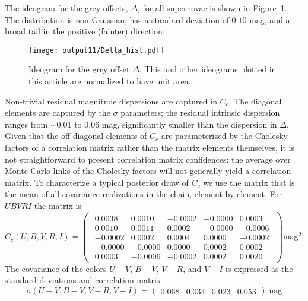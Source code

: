 \documentclass{aastex61}   	%
\begin{document}
The ideogram for the grey offsets, $\Delta$, for all supernovae is shown in Figure~\ref{hist:fig}.  The distribution is non-Gaussian, 
has a standard deviation of
$0.10$
mag, and a broad tail in the positive (fainter) direction.
\begin{figure}[htbp] %
   \centering
   \texttt{[image: output11/Delta\_hist.pdf]} 
   \caption{Ideogram for the grey offset $\Delta$.  This and other ideograms plotted in this article are normalized to have unit area.
   \label{hist:fig}}
\end{figure}


Non-trivial residual magnitude dispersions are captured in $C_c$.  The diagonal elements are captured by the $\sigma$ parameters;
the residual intrinsic dispersion ranges from
$\sim 0.01$ to 0.06 mag, significantly smaller
than the dispersion in $\Delta$.  Given that the 
off-diagonal elements of $C_c$ are parameterized by the Cholesky factors of a correlation matrix rather than the matrix elements themselves,
it is not straightforward to present correlation matrix confidences:
the average over Monte Carlo links of the
Cholesky factors will not  generally yield a correlation matrix.  
To characterize a typical posterior draw of $C_c$ we use the matrix that is the mean of all covariance realizations in the
chain, element by element.
For $UBVRI$ the matrix is
\begin{equation}
C_c(U,B,V,R,I)=
\begin{pmatrix}
\begin{array}{rrrrr}
0.0038 & 0.0010 & -0.0002 & -0.0000 & 0.0003 \\
0.0010 & 0.0011 & 0.0002 & -0.0000 & -0.0006 \\
-0.0002 & 0.0002 & 0.0004 & 0.0000 & -0.0002 \\
-0.0000 & -0.0000 & 0.0000 & 0.0002 & 0.0002 \\
0.0003 & -0.0006 & -0.0002 & 0.0002 & 0.0020
\end{array}
 \end{pmatrix} \text{mag}^2.
 \label{mag_cov:eqn}
 \end{equation}
The  covariance of the colors $U-V$, $B-V$, $V-R$, and $V-I$ is
expressed as the standard deviations and
 correlation matrix
 \begin{equation}
 \sigma(U-V, B-V, V-R, V-I)=
 \begin{pmatrix}
0.068 & 0.034& 0.023 & 0.053
  \end{pmatrix} \text{mag}
 \label{color_sd:eqn}
   \end{equation}
\end{document}
